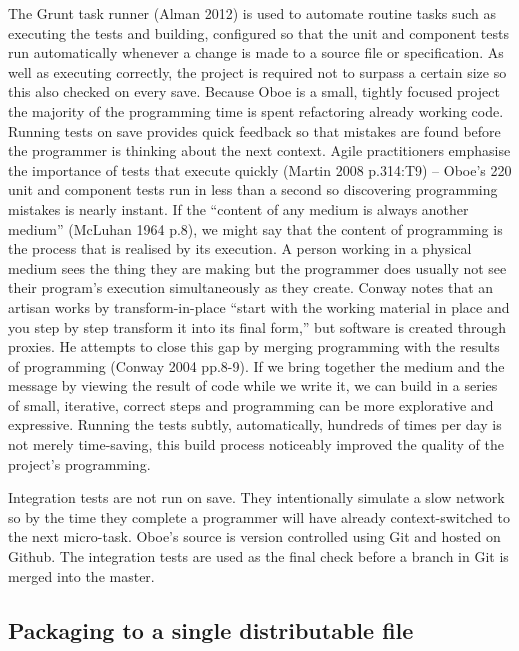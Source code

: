 \documentclass[12pt, ]{article}
\begin{document}
The Grunt task runner (Alman 2012) is used to automate routine tasks
such as executing the tests and building, configured so that the unit
and component tests run automatically whenever a change is made to a
source file or specification. As well as executing correctly, the
project is required not to surpass a certain size so this also checked
on every save. Because Oboe is a small, tightly focused project the
majority of the programming time is spent refactoring already working
code. Running tests on save provides quick feedback so that mistakes are
found before the programmer is thinking about the next context. Agile
practitioners emphasise the importance of tests that execute quickly
(Martin 2008 p.314:T9) -- Oboe's 220 unit and component tests run in
less than a second so discovering programming mistakes is nearly
instant. If the ``content of any medium is always another medium''
(McLuhan 1964 p.8), we might say that the content of programming is the
process that is realised by its execution. A person working in a
physical medium sees the thing they are making but the programmer does
usually not see their program's execution simultaneously as they create.
Conway notes that an artisan works by transform-in-place ``start with
the working material in place and you step by step transform it into its
final form,'' but software is created through proxies. He attempts to
close this gap by merging programming with the results of programming
(Conway 2004 pp.8-9). If we bring together the medium and the message by
viewing the result of code while we write it, we can build in a series
of small, iterative, correct steps and programming can be more
explorative and expressive. Running the tests subtly, automatically,
hundreds of times per day is not merely time-saving, this build process
noticeably improved the quality of the project's programming.

Integration tests are not run on save. They intentionally simulate a
slow network so by the time they complete a programmer will have already
context-switched to the next micro-task. Oboe's source is version
controlled using Git and hosted on Github. The integration tests are
used as the final check before a branch in Git is merged into the
master.

\subsection{Packaging to a single distributable
file}\label{packaging-to-a-single-distributable-file}
\end{document}
